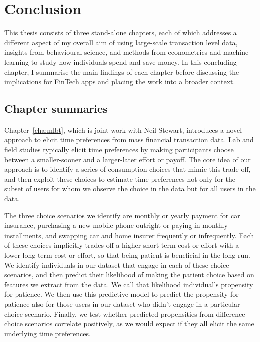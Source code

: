 
\chapter{Conclusion}%
\label{cha:conclusion}

This thesis consists of three stand-alone chapters, each of which addresses a
different aspect of my overall aim of using large-scale transaction level data,
insights from behavioural science, and methods from econometrics and machine
learning to study how individuals spend and save money. In this concluding
chapter, I summarise the main findings of each chapter before discussing
the implications for FinTech apps and placing the work into a broader context.

\section{Chapter summaries}

Chapter~\ref{cha:mlbt}, which is joint work with Neil Stewart, introduces a
novel approach to elicit time preferences from mass financial transaction data.
Lab and field studies typically elicit time preferences by making participants
choose between a smaller-sooner and a larger-later effort or payoff. The core
idea of our approach is to identify a series of consumption choices that mimic
this trade-off, and then exploit these choices to estimate time preferences not
only for the subset of users for whom we observe the choice in the data but for
all users in the data.

The three choice scenarios we identify are monthly or yearly payment for car
insurance, purchasing a new mobile phone outright or paying in monthly
installments, and swapping car and home insurer frequently or infrequently. Each of these choices implicitly trades off a higher short-term cost or effort with a lower long-term cost or effort, so that being patient is beneficial in the long-run. We identify individuals in our dataset that
engage in each of these choice scenarios, and then predict their likelihood of
making the patient choice based on features we extract from the data. We call
that likelihood individual's propensity for patience. We then use this
predictive model to predict the propensity for patience also for those users in
our dataset who didn't engage in a particular choice scenario. Finally, we test
whether predicted propensities from difference choice scenarios correlate
positively, as we would expect if they all elicit the same underlying time
preferences.

